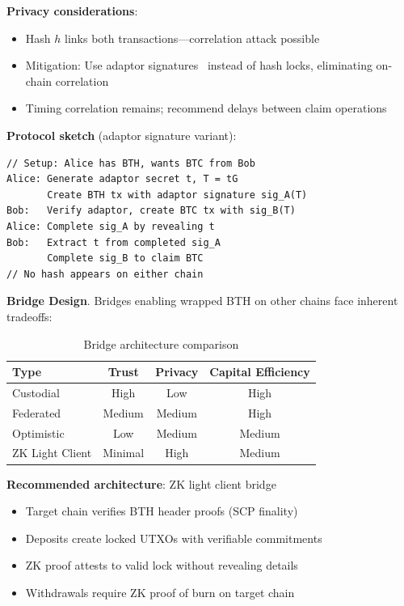\textbf{Privacy considerations}:
\begin{itemize}
  \item Hash $h$ links both transactions---correlation attack possible
  \item Mitigation: Use adaptor signatures~\cite{adaptor-signatures} instead
    of hash locks, eliminating on-chain correlation
  \item Timing correlation remains; recommend delays between claim operations
\end{itemize}

\textbf{Protocol sketch} (adaptor signature variant):
\begin{lstlisting}[caption={Privacy-preserving atomic swap}]
// Setup: Alice has BTH, wants BTC from Bob
Alice: Generate adaptor secret t, T = tG
       Create BTH tx with adaptor signature sig_A(T)
Bob:   Verify adaptor, create BTC tx with sig_B(T)
Alice: Complete sig_A by revealing t
Bob:   Extract t from completed sig_A
       Complete sig_B to claim BTC
// No hash appears on either chain
\end{lstlisting}

\textbf{Bridge Design}.
Bridges enabling wrapped BTH on other chains face inherent tradeoffs:

\begin{table}[h]
\centering
\caption{Bridge architecture comparison}
\label{tab:bridge-comparison}
\begin{tabular}{@{}lccc@{}}
\toprule
\textbf{Type} & \textbf{Trust} & \textbf{Privacy} & \textbf{Capital Efficiency} \\
\midrule
Custodial & High & Low & High \\
Federated & Medium & Medium & High \\
Optimistic & Low & Medium & Medium \\
ZK Light Client & Minimal & High & Medium \\
\bottomrule
\end{tabular}
\end{table}

\textbf{Recommended architecture}: ZK light client bridge
\begin{itemize}
  \item Target chain verifies BTH header proofs (SCP finality)
  \item Deposits create locked UTXOs with verifiable commitments
  \item ZK proof attests to valid lock without revealing details
  \item Withdrawals require ZK proof of burn on target chain
\end{itemize}

